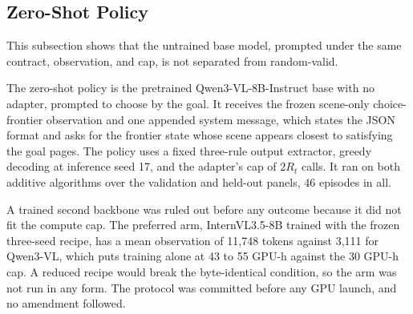 \subsection{Zero-Shot Policy}
\label{app:results-cf-zeroshot}

This subsection shows that the untrained base model, prompted under the same contract, observation, and cap, is not separated from random-valid.

The zero-shot policy is the pretrained Qwen3-VL-8B-Instruct base with no adapter, prompted to choose by the goal. It receives the frozen scene-only choice-frontier observation and one appended system message, which states the JSON format and asks for the frontier state whose scene appears closest to satisfying the goal pages. The policy uses a fixed three-rule output extractor, greedy decoding at inference seed 17, and the adapter's cap of $2R_t$ calls. It ran on both additive algorithms over the validation and held-out panels, 46 episodes in all.

A trained second backbone was ruled out before any outcome because it did not fit the compute cap. The preferred arm, InternVL3.5-8B trained with the frozen three-seed recipe, has a mean observation of 11,748 tokens against 3,111 for Qwen3-VL, which puts training alone at 43 to 55 GPU-h against the 30 GPU-h cap. A reduced recipe would break the byte-identical condition, so the arm was not run in any form. The protocol was committed before any GPU launch, and no amendment followed.

